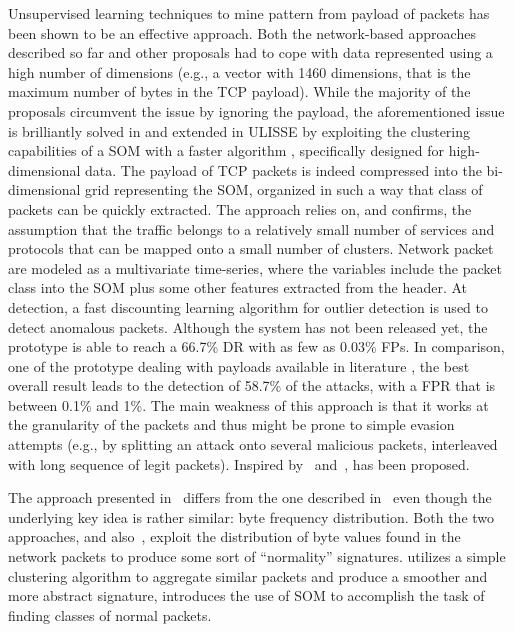 Unsupervised learning techniques to mine pattern from payload of
packets has been shown to be an effective approach. Both the
network-based approaches described so far and other proposals
\citep{nsom,NETAD} had to cope with data represented using a high
number of dimensions (e.g., a vector with 1460 dimensions, that is the
maximum number of bytes in the \ac{TCP} payload). While the
majority of the proposals circumvent the issue by ignoring the
payload, the aforementioned issue is brilliantly solved in
\citep{ramadas} and extended in \ac{ULISSE}
\citep{zanero-savaresi,zanero-pattern} by exploiting the clustering
capabilities of a \ac{SOM} \citep{bibbiasom} with a faster algorithm
\citep{zanero-speedup}, specifically designed for high-dimensional
data. The payload of \ac{TCP} packets is indeed compressed into the
bi-dimensional grid representing the \ac{SOM}, organized in such a way
that class of packets can be quickly extracted. The approach relies
on, and confirms, the assumption that the traffic belongs to a
relatively small number of services and protocols that can be mapped
onto a small number of clusters. Network packet are modeled as a
multivariate time-series, where the variables include the packet class
into the \ac{SOM} plus some other features extracted from the
header. At detection, a fast discounting learning algorithm for
outlier detection \citep{smartsifter} is used to detect anomalous
packets. Although the system has not been released yet, the prototype
is able to reach a 66.7\% \ac{DR} with as few as 0.03\%
\acp{FP}. In comparison, one of the prototype dealing with
payloads available in literature \citep{wang:raid2005:payl}, the best
overall result leads to the detection of 58.7\% of the attacks, with a
\ac{FPR} that is between 0.1\% and 1\%. The main weakness of this
approach is that it works at the granularity of the packets and thus
might be prone to simple evasion attempts (e.g., by splitting an
attack onto several malicious packets, interleaved with long sequence
of legit packets). Inspired by~\citep{wang:raid2005:payl}
and~\citep{zanero-savaresi}, \citep{DBLP:conf/iwia/BolzoniEHZ06} has
been proposed.

The approach presented in~\citep{wang:raid2005:payl} differs from the
one described in~\citep{zanero-savaresi,zanero-pattern} even though
the underlying key idea is rather similar: byte frequency
distribution. Both the two approaches, and
also~\citep{kruegel:sac2002:anomaly}, exploit the distribution of byte
values found in the network packets to produce some sort of
``normality'' signatures. \citep{wang:raid2005:payl} utilizes a simple
clustering algorithm to aggregate similar packets and produce a
smoother and more abstract signature,
\citep{zanero-savaresi,zanero-pattern} introduces the use of \ac{SOM}
to accomplish the task of finding classes of normal packets.


